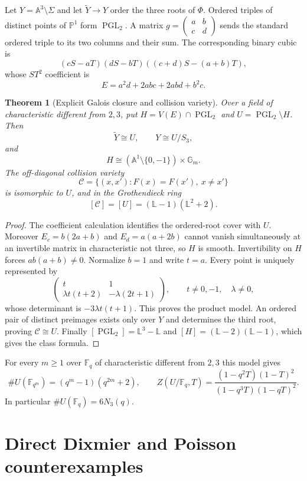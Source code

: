 \documentclass[11pt]{article}
\newtheorem{theorem}{Theorem}[section]
\theoremstyle{remark}
\newcommand{\A}{\mathbb A}
\begin{document}
Let $Y=\A^3\setminus\Sigma$ and let $\widetilde Y\to Y$ order the three
roots of $\Phi$. Ordered triples of distinct points of $\mathbb P^1$ form
$\operatorname{PGL}_2$. A matrix
$g=\left(\begin{smallmatrix}a&b\\c&d\end{smallmatrix}\right)$ sends the
standard ordered triple to its two columns and their sum. The corresponding
binary cubic is
\[
(cS-aT)(dS-bT)((c+d)S-(a+b)T),
\]
whose $ST^2$ coefficient is
\[
E=a^2d+2abc+2abd+b^2c.
\]

\begin{theorem}[Explicit Galois closure and collision variety]
Over a field of characteristic different from $2,3$, put
$H=V(E)\cap\operatorname{PGL}_2$ and
$U=\operatorname{PGL}_2\setminus H$. Then
\[
\widetilde Y\cong U,\qquad Y\cong U/S_3,
\]
and
\[
H\cong(\A^1\setminus\{0,-1\})\times\mathbb G_m.
\]
The off-diagonal collision variety
\[
\mathcal C=\{(x,x'):F(x)=F(x'),\ x\ne x'\}
\]
is isomorphic to $U$, and in the Grothendieck ring
\[
[\mathcal C]=[U]=(\mathbb L-1)(\mathbb L^2+2).
\]
\end{theorem}
\begin{proof}
The coefficient calculation identifies the ordered-root cover with $U$.
Moreover $E_c=b(2a+b)$ and $E_d=a(a+2b)$ cannot vanish simultaneously at
an invertible matrix in characteristic not three, so $H$ is smooth.
Invertibility on $H$ forces $ab(a+b)\ne0$. Normalize $b=1$ and write $t=a$.
Every point is uniquely represented by
\[
\begin{pmatrix}t&1\\ \lambda t(t+2)&-\lambda(2t+1)\end{pmatrix},
\qquad t\ne0,-1,\quad\lambda\ne0,
\]
whose determinant is $-3\lambda t(t+1)$. This proves the product model.
An ordered pair of distinct preimages exists only over $Y$ and determines
the third root, proving $\mathcal C\cong U$. Finally
$[\operatorname{PGL}_2]=\mathbb L^3-\mathbb L$ and
$[H]=(\mathbb L-2)(\mathbb L-1)$, which gives the class formula.
\end{proof}

For every $m\ge1$ over $\mathbb F_q$ of characteristic different from
$2,3$ this model gives
\[
\#U(\mathbb F_{q^m})=(q^m-1)(q^{2m}+2),
\qquad
Z(U/\mathbb F_q,T)=
\frac{(1-q^2T)(1-T)^2}{(1-q^3T)(1-qT)^2}.
\]
In particular $\#U(\mathbb F_q)=6N_3(q)$.

\section{Direct Dixmier and Poisson counterexamples}
\end{document}
